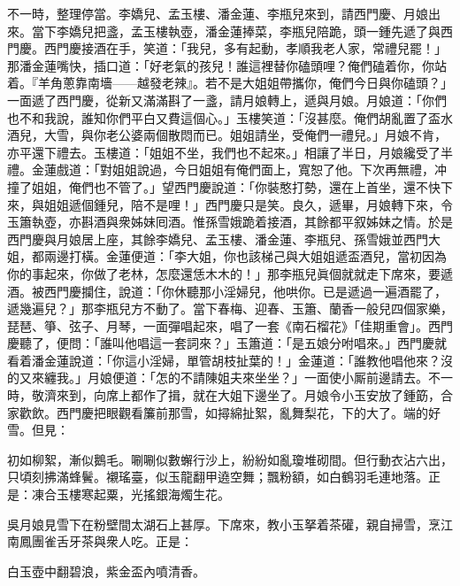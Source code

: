 不一時，整理停當。李嬌兒、孟玉樓、潘金蓮、李瓶兒來到，請西門慶、月娘出來。當下李嬌兒把盞，孟玉樓執壺，潘金蓮捧菜，李瓶兒陪跪，頭一鍾先遞了與西門慶。西門慶接酒在手，笑道：「我兒，多有起動，孝順我老人家，常禮兒罷！」那潘金蓮嘴快，插口道：「好老氣的孩兒！誰這裡替你磕頭哩？俺們磕着你，你站着。『羊角蔥靠南墻——越發老辣』。若不是大姐姐帶攜你，俺們今日與你磕頭？」一面遞了西門慶，從新又滿滿斟了一盞，請月娘轉上，遞與月娘。月娘道：「你們也不和我說，誰知你們平白又費這個心。」玉樓笑道：「沒甚麼。俺們胡亂置了盃水酒兒，大雪，與你老公婆兩個散悶而已。姐姐請坐，受俺們一禮兒。」月娘不肯，亦平還下禮去。玉樓道：「姐姐不坐，我們也不起來。」相讓了半日，月娘纔受了半禮。金蓮戲道：「對姐姐說過，今日姐姐有俺們面上，寬恕了他。下次再無禮，冲撞了姐姐，俺們也不管了。」{}望西門慶說道：「你裝憨打勢，還在上首坐，還不快下來，與姐姐遞個鍾兒，陪不是哩！」西門慶只是笑。良久，遞畢，月娘轉下來，令玉簫執壺，亦斟酒與衆姊妹囘酒。惟孫雪娥跪着接酒，其餘都平叙姊妹之情。於是西門慶與月娘居上座，其餘李嬌兒、孟玉樓、潘金蓮、李瓶兒、孫雪娥並西門大姐，都兩邊打橫。金蓮便道：「李大姐，你也該梯己與大姐姐遞盃酒兒，當初因為你的事起來，你做了老林，怎麼還恁木木的！」{}那李瓶兒眞個就就走下席來，要遞酒。{}被西門慶攔住，說道：「你休聽那小淫婦兒，他哄你。{}已是遞過一遍酒罷了，遞幾遍兒？」那李瓶兒方不動了。當下春梅、迎春、玉簫、蘭香一般兒四個家樂，琵琶、箏、弦子、月琴，一面彈唱起來，唱了一套《南石榴花》「佳期重會」。{}西門慶聽了，便問：「誰叫他唱這一套詞來？」玉簫道：「是五娘分咐唱來。」西門慶就看着潘金蓮說道：{}「你這小淫婦，單管胡枝扯葉的！」金蓮道：「誰教他唱他來？沒的又來纏我。」月娘便道：「怎的不請陳姐夫來坐坐？」一面使小厮前邊請去。不一時，敬濟來到，向席上都作了揖，就在大姐下邊坐了。月娘令小玉安放了鍾筯，合家歡飲。西門慶把眼觀看簾前那雪，如撏綿扯絮，亂舞梨花，下的大了。端的好雪。但見：

\begin{myquote} 
初如柳絮，漸似鵝毛。唰唰似數蠏行沙上，紛紛如亂瓊堆砌間。但行動衣沾六出，只頃刻拂滿蜂鬢。襯瑤臺，似玉龍翻甲遶空舞；飄粉額，如白鶴羽毛連地落。正是：凍合玉樓寒起粟，光搖銀海燭生花。
\end{myquote} 

吳月娘見雪下在粉壁間太湖石上甚厚。下席來，教小玉拏着茶礶，親自掃雪，烹江南鳳團雀舌牙茶與衆人吃。正是：

\begin{myquote} 
白玉壺中翻碧浪，紫金盃內噴清香。
\end{myquote} 

